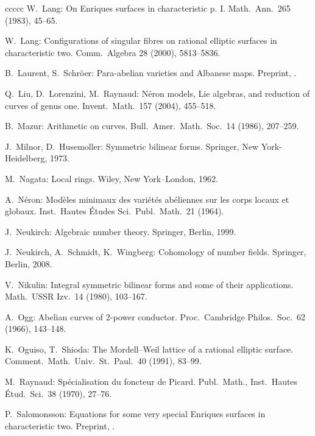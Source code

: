 \documentclass[oneside, 12pt]{amsart}
\theoremstyle{definition}
\theoremstyle{remark}
\begin{document}
\begin{thebibliography}{ccccc}
W.\ Lang:
On Enriques surfaces in characteristic p. I. 
Math.\ Ann.\ 265 (1983),  45--65. 

W.\ Lang:
Configurations of singular fibres on rational elliptic surfaces in characteristic two. 
Comm.\ Algebra  28  (2000),  5813--5836.

B.\ Laurent, S.\ Schr\"oer:
Para-abelian varieties and  Albanese maps.
Preprint, .

Q.\ Liu, D.\ Lorenzini, M.\ Raynaud:
N\'eron models, Lie algebras, and reduction of curves of genus one.
Invent.\ Math.\ 157 (2004),  455--518.

B.\ Mazur:
Arithmetic on curves. 
Bull.\ Amer.\ Math.\ Soc.\  14 (1986),  207--259.
 
J.\ Milnor, D.\ Husemoller:
Symmetric bilinear forms.
Springer, New York-Heidelberg, 1973.

M.\ Nagata:
Local rings. 
Wiley, New York--London, 1962.

A.\ N\'eron:
Mod\`eles minimaux des vari\'et\'es ab\'eliennes sur les corps locaux et globaux.  
Inst.\ Hautes \'Etudes Sci.\ Publ.\ Math.\   21 (1964).

J.\ Neukirch:
Algebraic number theory. 
Springer, Berlin, 1999.

J.\ Neukirch, A.\  Schmidt, K.\ Wingberg:
Cohomology of number fields. 
Springer, Berlin, 2008.
 
V.\ Nikulin:
Integral symmetric bilinear forms and some of their applications.
Math.\ USSR Izv.\ 14 (1980),   103--167.

A.\ Ogg:
Abelian curves of $2$-power conductor.  
Proc.\ Cambridge Philos.\ Soc.\  62  (1966), 143--148. 

K.\ Oguiso, T.\ Shioda:
The Mordell--Weil lattice of a rational elliptic surface.
Comment.\ Math.\ Univ.\ St.\ Paul.\ 40 (1991), 83--99.

M.\ Raynaud:
Sp\'ecialisation du foncteur de Picard.
Publ.\ Math., Inst.\ Hautes \'Etud.\ Sci.\ 38 (1970), 27--76.

P.\  Salomonsson:
Equations for some very special Enriques surfaces in characteristic two.
Preprint, .


\end{thebibliography}
\end{document}
